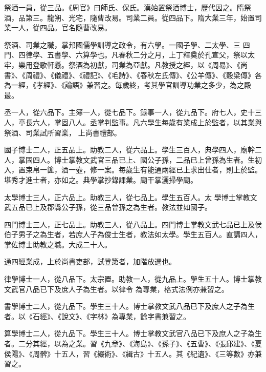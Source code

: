 \begin{pinyinscope}
 祭酒一員，從三品。《周官》曰師氏、保氏。漢始置祭酒博士，歷代因之。隋祭酒，品第三。龍朔、光宅，隨曹改易。司業二員。從四品下。隋大業三年，始置司業一人，從四品。官名隨曹改易。



 祭酒、司業之職，掌邦國儒學訓導之政令，有六學。一國子學、二太學、三
 四門、四律學、五書學、六算學也。凡春秋二分之月，上丁釋奠於孔宣父，祭以太牢，樂用登歌軒懸。祭酒為初獻，司業為亞獻。凡教授之經，以《周易》、《尚書》、《周禮》、《儀禮》、《禮記》、《毛詩》、《春秋左氏傳》、《公羊傳》、《穀梁傳》各為一經，《孝經》、《論語》兼習之。每歲終，考其學官訓導功業之多少，為之殿最。



 丞一人，從六品下。主簿一人，從七品下。錄事一人，從九品下。府七人，史十三人，亭長六人，掌固八人。丞掌判監事。凡六學生每歲有業成上於監者，以其業與祭酒、司業試所習業，
 上尚書禮部。



 國子博士二人，正五品上。助教二人，從六品上。學生三百人，典學四人，廟幹二人，掌固四人。博士掌教文武官三品已上、國公子孫，二品已上曾孫為生者。生初入，置束帛一篚，酒一壺，修一案。每歲生有能通兩經已上求出仕者，則上於監。堪秀才進士者，亦如之。典學掌抄錄課業。廟干掌灑掃學廟。



 太學博士三人，正六品上。助教三人，從七品上。學生五百人。太
 學博士掌教文武五品已上及郡縣公子孫，從三品曾孫之為生者。教法並如國子。



 四門博士三人，正七品上。助教三人，從八品上。四門博士掌教文武七品已上及侯伯子男子之為生者，若庶人子為俊士生者，教法如太學。學生五百人。直講四人，掌佐博士助教之職。大成二十人。



 通四經業成，上於尚書吏部，試登第者，加階放選也。



 律學博士一人，從八品下。太宗置。助教一人，從九品上。學生五十人。博士掌教文武官八品已下及庶人子為生者。以律令
 為專業，格式法例亦兼習之。



 書學博士二人，從九品下。學生三十人。博士掌教文武八品已下及庶人之子為生者。以《石經》、《說文》、《字林》為專業，餘字書兼習之。



 算學博士二人，從九品下。學生三十人。博士掌教文武官八品已下及庶人之子為生者。二分其經，以為之業。習《九章》、《海島》、《孫子》、《五曹》、《張邱建》、《夏侯陽》、《周髀》十五人，習《綴術》、《緝古》十五人。其《紀遺》、《三等數》亦兼習之。




\end{pinyinscope}
